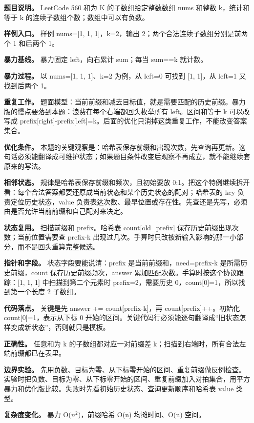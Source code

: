 \textbf{题目说明。} LeetCode 560 和为 K 的子数组给定整数数组 nums 和整数 k，统计和等于 k 的连续子数组个数；数组中可以有负数。

\textbf{样例入口。} 样例 nums=[1, 1, 1]，k=2，输出 2；两个合法连续子数组分别是前两个 1 和后两个 1。

\textbf{暴力基线。} 暴力固定 left，向右累计 sum；每当 sum==k 就计数。

\textbf{暴力过程。} 以 nums=[1, 1, 1]、k=2 为例，从 left=0 可找到 [1, 1]，从 left=1 又找到后两个 1。

\textbf{重复工作。} 题面模型：当前前缀和减去目标值，就是需要匹配的历史前缀。暴力版的慢点要落到本题：浪费在每个右端都回头枚举所有 left。区间和等于 k 可以改写成 prefix[right]-prefix[left]=k。后面的优化只消掉这类重复工作，不能改变答案集合。

\textbf{优化条件。} 本题的关键观察是：哈希表保存前缀和出现次数，先查询再更新。这句话必须能翻译成可维护状态；如果题目条件改变后观察不再成立，就不能继续套原来的写法。

\textbf{相邻状态。} 规律是哈希表保存前缀和频次，且初始要放 0:1。把这个特例继续拆开看：每个合法答案都要还原成当前状态和某个历史状态的配对；哈希表的 key 负责定位历史状态，value 负责表达次数、最早位置或存在性。先查还是先写，必须由是否允许当前前缀和自己配对来决定。

\textbf{状态复用。} 扫描前缀和 prefix。哈希表 count[old\_prefix] 保存历史前缀出现次数；当前位置需要查 prefix-k 出现过几次。手算时只改被新输入影响的那一小部分，而不是回头重算完整候选。

\textbf{指针和字段。} 状态字段要能说清：prefix 是当前前缀和，need=prefix-k 是所需历史前缀，count 保存历史前缀频次，answer 累加匹配次数。手算时按这个协议跟踪：[1, 1, 1] 中扫描到第二个元素时 prefix=2，需要历史 0，count[0]=1，所以找到第一个长度 2 子数组。

\textbf{代码落点。} 关键是先 answer += count[prefix-k]，再 count[prefix]++。初始化 count[0]=1，表示从下标 0 开始的区间。关键代码行必须能逐句翻译成“旧状态怎样变成新状态”，否则就只是模板。

\textbf{正确性。} 任意和为 k 的子数组都对应一对前缀差 k；扫描到右端时，所有合法左端前缀都已在表里。

\textbf{边界实验。} 先用负数、目标为零、从下标零开始的区间、重复前缀做反例检查。实验时把负数、目标为零、从下标零开始的区间、重复前缀加入对拍集合，用平方暴力和优化版比较。失败时先看初始历史状态、查询更新顺序和哈希表 value 类型。

\textbf{复杂度变化。} 暴力 O(\ensuremath{n^{2}})，前缀哈希 O(n) 均摊时间、O(n) 空间。

